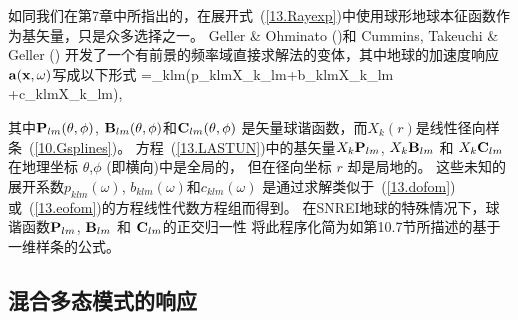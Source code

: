 {{{%

如同我们在第7章中所指出的，在展开式~(\ref{13.Rayexp})中使用球形地球本征函数作为基矢量，只是众多选择之一。
Geller \& Ohminato (\citeyear{geller&ohminato94})和
Cummins, Takeuchi \& Geller (\citeyear{cummins&al97})
开发了一个有前景的频率域直接求解法的变体，其中地球的加速度响应$\mbox{${\bf a}$}(\mbox{${\bf x}$},\omega)$写成以下形式
\eq \label{13.LASTUN}
\ba=\sum_{klm}\left(p_{klm}X_k\bP_{lm}+b_{klm}X_k\bB_{lm}
+c_{klm}X_k\bC_{lm}\right),
\en

其中$\mbox{${\bf P}$}_{lm}(\theta,\phi)$, $\mbox{${\bf B}$}_{lm}(\theta,\phi)$和$\mbox{${\bf C}$}_{lm}(\theta,\phi)$
是矢量球谐函数，而$X_k(r)$是线性径向样条~(\ref{10.Gsplines})。
方程~(\ref{13.LASTUN})中的基矢量$X_k\mbox{${\bf P}$}_{lm}$,
$X_k\mbox{${\bf B}$}_{lm}$ 和 $X_k\mbox{${\bf C}$}_{lm}$在地理坐标 $\theta$,$\phi$ (即横向)中是全局的，
但在径向坐标 $r$ 却是局地的。
这些未知的展开系数$p_{klm}(\omega)$, $b_{klm}(\omega)$和$c_{klm}(\omega)$
是通过求解类似于~(\ref{13.dofom}) 或~(\ref{13.eofom})的方程线性代数方程组而得到。
在SNREI地球的特殊情况下，球谐函数$\mbox{${\bf P}$}_{lm}$, $\mbox{${\bf B}$}_{lm}$ 和 $\mbox{${\bf C}$}_{lm}$的正交归一性
将此程序化简为如第10.7节所描述的基于一维样条的公式。
%

\subsection{混合多态模式的响应}
%
%
\label{13.sec.hybrid}

}}}
